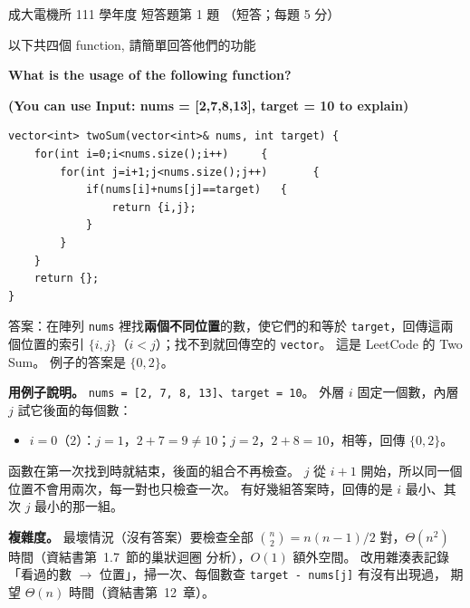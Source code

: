 \begin{pastexam}[label={px:ncku-111-ee-ds-21}]{成大電機所 111 學年度 短答題第 1 題}
（短答；每題 5 分）

以下共四個 function, 請簡單回答他們的功能

\textbf{What is the usage of the following function?}

\textbf{(You can use Input: nums = [2,7,8,13], target = 10 to explain)}
\begin{verbatim}
vector<int> twoSum(vector<int>& nums, int target) {
    for(int i=0;i<nums.size();i++)     {
        for(int j=i+1;j<nums.size();j++)       {
            if(nums[i]+nums[j]==target)   {
                return {i,j};
            }
        }
    }
    return {};
}
\end{verbatim}
\end{pastexam}

\begin{pastsoln}
答案：在陣列 \texttt{nums} 裡找\textbf{兩個不同位置}的數，使它們的和等於 \texttt{target}，回傳這兩個位置的索引
$\{i, j\}$（$i < j$）；找不到就回傳空的 \texttt{vector}。 這是 LeetCode 的 Two Sum。 例子的答案是 $\{0, 2\}$。

\textbf{用例子說明。} \texttt{nums = [2, 7, 8, 13]}、\texttt{target = 10}。 外層 $i$ 固定一個數，內層 $j$ 試它後面的每個數：
\begin{itemize}
\item $i = 0$（$2$）：$j = 1$，$2 + 7 = 9 \ne 10$；$j = 2$，$2 + 8 = 10$，相等，回傳 $\{0, 2\}$。
\end{itemize}
函數在第一次找到時就結束，後面的組合不再檢查。 $j$ 從 $i + 1$ 開始，所以同一個位置不會用兩次，每一對也只檢查一次。
有好幾組答案時，回傳的是 $i$ 最小、其次 $j$ 最小的那一組。

\textbf{複雜度。} 最壞情況（沒有答案）要檢查全部 $\binom{n}{2} = n(n-1)/2$ 對，$\Theta(n^2)$ 時間（資結書第~1.7~節的巢狀迴圈
分析），$O(1)$ 額外空間。 改用雜湊表記錄「看過的數 $\to$ 位置」，掃一次、每個數查 \texttt{target - nums[j]} 有沒有出現過，
期望 $\Theta(n)$ 時間（資結書第~12~章）。
\end{pastsoln}
